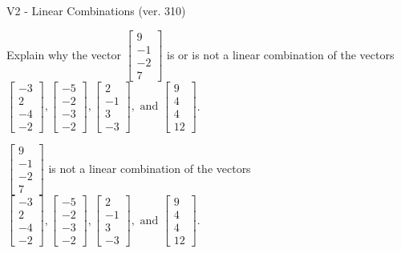 \begin{exercise}
  \begin{exerciseTitle}V2 - Linear Combinations (ver. 310)\end{exerciseTitle}
  \begin{exerciseStatement}
    Explain why the vector \(\left[\begin{array}{c}
9 \\
-1 \\
-2 \\
7
\end{array}\right]\)  is or is not a linear 
	combination of the vectors \(\left[\begin{array}{c}
-3 \\
2 \\
-4 \\
-2
\end{array}\right] , \left[\begin{array}{c}
-5 \\
-2 \\
-3 \\
-2
\end{array}\right] , \left[\begin{array}{c}
2 \\
-1 \\
3 \\
-3
\end{array}\right] , \text{ and } \left[\begin{array}{c}
9 \\
4 \\
4 \\
12
\end{array}\right]\).
	


  \end{exerciseStatement}
  \begin{exerciseAnswer}
   \(\left[\begin{array}{c}
9 \\
-1 \\
-2 \\
7
\end{array}\right]\) 
  	 is not  
	a linear combination of the vectors \(\left[\begin{array}{c}
-3 \\
2 \\
-4 \\
-2
\end{array}\right] , \left[\begin{array}{c}
-5 \\
-2 \\
-3 \\
-2
\end{array}\right] , \left[\begin{array}{c}
2 \\
-1 \\
3 \\
-3
\end{array}\right] , \text{ and } \left[\begin{array}{c}
9 \\
4 \\
4 \\
12
\end{array}\right]\).


\end{exerciseAnswer}
\end{exercise}
